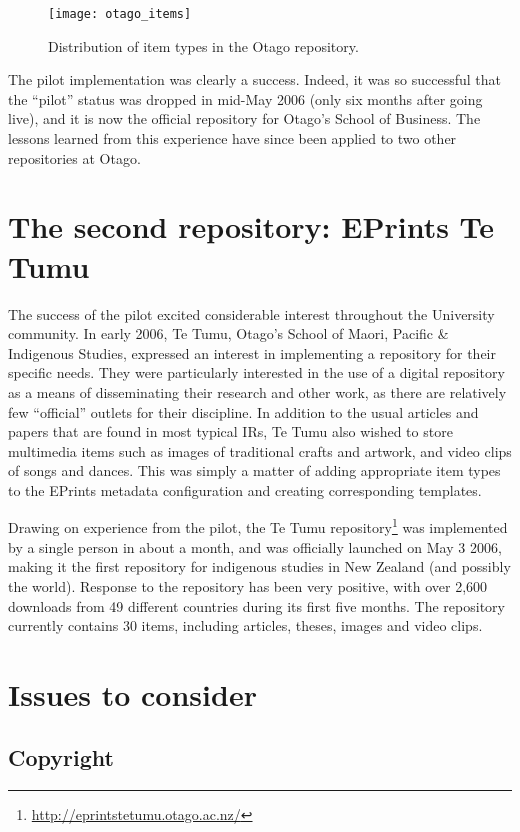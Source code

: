 \documentclass[12pt,pdftex,a4paper,titlepage]{article}
\begin{document}
\begin{figure}
	\centering
	\texttt{[image: otago\_items]}
	\caption{Distribution of item types in the Otago repository.}
	\label{fig-item-types}
\end{figure}


The pilot implementation was clearly a success. Indeed, it was so successful that the ``pilot'' status was dropped in mid-May 2006 (only six months after going live), and it is now the official repository for Otago's School of Business. The lessons learned from this experience have since been applied to two other repositories at Otago.


\section{The second repository: EPrints Te Tumu}

The success of the pilot excited considerable interest throughout the University community. In early 2006, Te Tumu, Otago's School of Maori, Pacific \& Indigenous Studies, expressed an interest in implementing a repository for their specific needs. They were particularly interested in the use of a digital repository as a means of disseminating their research and other work, as there are relatively few ``official'' outlets for their discipline. In addition to the usual articles and papers that are found in most typical IRs, Te Tumu also wished to store multimedia items such as images of traditional crafts and artwork, and video clips of songs and dances. This was simply a matter of adding  appropriate item types to the EPrints metadata configuration and creating corresponding templates.

Drawing on experience from the pilot, the Te Tumu repository\footnote{\url{http://eprintstetumu.otago.ac.nz/}} was implemented by a single person in about a month, and was officially launched on May 3 2006, making it the first repository for indigenous studies in New Zealand (and possibly the world). Response to the repository has been very positive, with over 2,600 downloads from 49 different countries during its first five months. The repository currently contains 30 items, including articles, theses, images and video clips.


\section{Issues to consider}


\subsection{Copyright}
\end{document}
